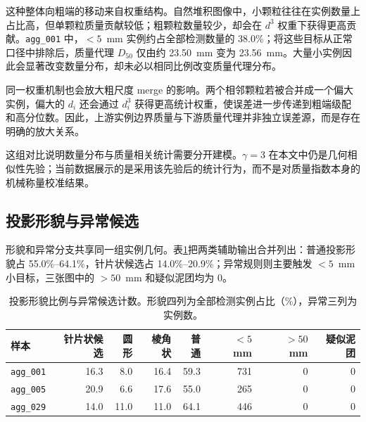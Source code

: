 这种整体向粗端的移动来自权重结构。自然堆积图像中，小颗粒往往在实例数量上占比高，但单颗粒质量贡献较低；粗颗粒数量较少，却会在 $d^3$ 权重下获得更高贡献。\texttt{agg\_001} 中，$<5$~mm 实例约占全部检测数量的 38.0\%；将这些目标从正常口径中排除后，质量代理 $D_{50}$ 仅由约 23.50~mm 变为 23.56~mm。大量小实例因此会显著改变数量分布，却未必以相同比例改变质量代理分布。

同一权重机制也会放大粗尺度 merge 的影响。两个相邻颗粒若被合并成一个偏大实例，偏大的 $d_i$ 还会通过 $d_i^3$ 获得更高统计权重，使误差进一步传递到粗端级配和高分位数。因此，上游实例边界质量与下游质量代理并非独立误差源，而是存在明确的放大关系。

这组对比说明数量分布与质量相关统计需要分开建模。$\gamma=3$ 在本文中仍是几何相似性先验；当前数据展示的是采用该先验后的统计行为，而不是对质量指数本身的机械称量校准结果。

\subsection{投影形貌与异常候选}

形貌和异常分支共享同一组实例几何。表\ref{tab:r-final-shape-anomaly}把两类辅助输出合并列出：普通投影形貌占 55.0\%--64.1\%，针片状候选占 14.0\%--20.9\%；异常规则则主要触发 $<5$~mm 小目标，三张图中的 $>50$~mm 和疑似泥团均为 0。

\begin{table}[t]
\centering
\caption{投影形貌比例与异常候选计数。形貌四列为全部检测实例占比（\%），异常三列为实例数。}
\label{tab:r-final-shape-anomaly}
\footnotesize
\renewcommand{\arraystretch}{1.10}
\begin{tabular}{lrrrrrrr}
\toprule
样本 & 针片状候选 & 圆形 & 棱角状 & 普通 & $<5$~mm & $>50$~mm & 疑似泥团 \\
\midrule
\texttt{agg\_001} & 16.3 & 8.0 & 16.4 & 59.3 & 731 & 0 & 0 \\
\texttt{agg\_005} & 20.9 & 6.6 & 17.6 & 55.0 & 265 & 0 & 0 \\
\texttt{agg\_029} & 14.0 & 11.0 & 11.0 & 64.1 & 446 & 0 & 0 \\
\bottomrule
\end{tabular}
\end{table}


